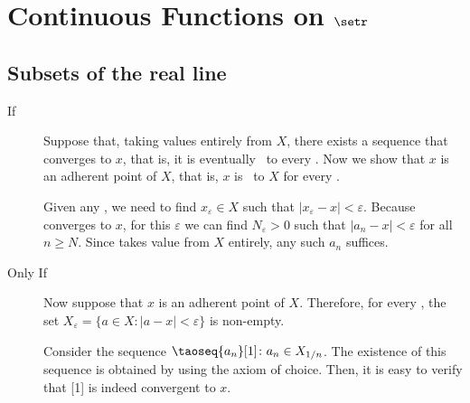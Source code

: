 \section{Continuous Functions on $\setr$}
\subsection{Subsets of the real line}

\begin{description}
	\item[If] Suppose that, taking values entirely from $X$, there exists a sequence  that converges to $x$, that is, it is eventually \eclose\ to every \pose. Now we show that $x$ is an adherent point of $X$, that is, $x$ is \eadherent\ to $X$ for every \pose.
	
	Given any \pose, we need to find $x_\varepsilon \in X$ such that $|x_\varepsilon - x| < \varepsilon$. Because  converges to $x$, for this $\varepsilon$ we can find $N_\varepsilon > 0$ such that $|a_n - x| < \varepsilon$ for all $n \ge N$. Since  takes value from $X$ entirely, any such $a_n$ suffices.
	
	\item[Only If] Now suppose that $x$ is an adherent point of $X$. Therefore, for every \pose, the set $X_\varepsilon = \{a \in X\colon |a-x| < \varepsilon\}$ is non-empty. 
	
	Consider the sequence $\taoseq{a_n}[1]\colon a_n \in X_{1/n}$. The existence of this sequence is obtained by using the axiom of choice. Then, it is easy to verify that  is indeed convergent to $x$.
\end{description}